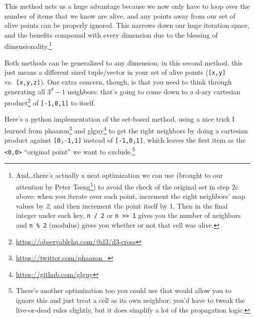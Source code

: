 \documentclass[]{article}
\renewcommand{\href}[2]{#2\footnote{\url{#1}}}
\begin{document}
This method nets us a huge advantage because we now only have to loop over the
number of items that we know are alive, and any points away from our set of
alive points can be properly ignored. This narrows down our huge iteration
space, and the benefits compound with every dimension due to the blessing of
dimensionality.\footnote{And\ldots there's actually a neat optimization we can
  use (brought to our attention by
  \href{https://www.reddit.com/r/adventofcode/comments/kfb6zx/day_17_getting_to_t6_at_for_higher_spoilerss/ghmllf8}{Peter
  Tseng}) to avoid the check of the original set in step 2c above: when you
  iterate over each point, increment the eight neighbors' map values by
  \emph{2}, and then increment the point itself by 1. Then in the final integer
  under each key, \texttt{n\ /\ 2} or
  \texttt{n\ \textgreater{}\textgreater{}\ 1} gives you the number of neighbors
  and \texttt{n\ \%\ 2} (modulus) gives you whether or not that cell was alive.}

Both methods can be generalized to any dimension; in this second method, this
just means a different sized tuple/vector in your set of alive points
(\texttt{{[}x,y{]}} vs.~\texttt{{[}x,y,z{]}}). One extra concern, though, is
that you need to think through generating all \(3^d-1\) neighbors: that's going
to come down to a d-ary \href{https://observablehq.com/@d3/d3-cross}{cartesian
product} of \texttt{{[}-1,0,1{]}} to itself.

Here's a python implementation of the set-based method, using a nice trick I
learned from \href{https://twitter.com/phaazon_}{phaazon} and
\href{https://github.com/glguy}{glguy} to get the right neighbors by doing a
cartesian product against \texttt{{[}0,-1,1{]}} instead of
\texttt{{[}-1,0,1{]}}, which leaves the first item as the
\texttt{\textless{}0,0\textgreater{}} ``original point'' we want to
exclude.\footnote{There's another optimization too you could use that would
  allow you to ignore this and just treat a cell as its own neighbor; you'd have
  to tweak the live-or-dead rules slightly, but it does simplify a lot of the
  propagation logic.}
\end{document}
